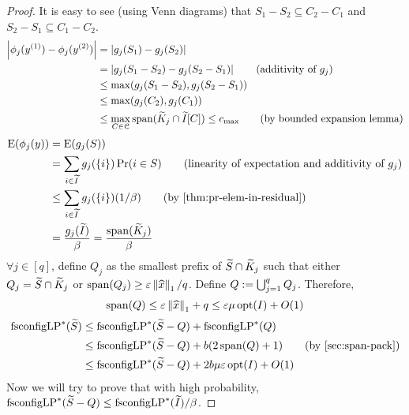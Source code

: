 \begin{proof}
It is easy to see (using Venn diagrams) that
$S_1 - S_2 \subseteq C_2 - C_1$ and $S_2 - S_1 \subseteq C_1 - C_2$.
\begin{align*}
\left\lvert \phi_j(y^{(1)}) - \phi_j(y^{(2)}) \right\rvert
&= \left\lvert g_j(S_1) - g_j(S_2) \right\rvert
\\ &= \left\lvert g_j(S_1 - S_2) - g_j(S_2 - S_1) \right\rvert  \tag{additivity of $g_j$}
\\ &\le \max(g_j(S_1 - S_2), g_j(S_2 - S_1))
\\ &\le \max(g_j(C_2), g_j(C_1))
\\ &\le \max_{C \in \mathcal{C}} \operatorname{span}(\widetilde{K}_j \cap \widetilde{I}[C])
\le c_{\max}  \tag{by bounded expansion lemma}
\end{align*}
\begin{align*}
\E(\phi_j(y)) &= \E(g_j(S))
\\ &= \sum_{i \in \Itild} g_j(\{i\}) \Pr(i \in S)
    \tag{linearity of expectation and additivity of $g_j$}
\\ &\le \sum_{i \in \Itild} g_j(\{i\}) (1/\beta)
    \tag{by \cref{thm:pr-elem-in-residual}}
\\ &= \frac{g_j(\Itild)}{\beta} = \frac{\Span(\Ktild_j)}{\beta}
\end{align*}
$\forall j \in [q]$, define $Q_j$ as the smallest prefix of $\widetilde{S} \cap \widetilde{K}_j$
such that either $Q_j = \widetilde{S} \cap \widetilde{K}_j$ or $\operatorname{span}(Q_j) \ge \varepsilon\left\lVert \widehat{x} \right\rVert_1/q$.
Define $Q := \bigcup_{j=1}^q Q_j$. Therefore,
\[ \operatorname{span}(Q) \le \varepsilon \left\lVert \widehat{x} \right\rVert_1 + q \le \varepsilon \mu \operatorname{opt}(I) + O(1) \]
\begin{align*}
\fscLP^*(\Stild) &\le \fscLP^*(\Stild - Q) + \fscLP^*(Q)
\\ &\le \fscLP^*(\Stild - Q) + b(2\Span(Q) + 1)  \tag{by \cref{sec:span-pack}}
\\ &\le \fscLP^*(\Stild - Q) + 2b\mu\epsLP\opt(I) + O(1)
\end{align*}
Now we will try to prove that with high probability,
$\operatorname{fsconfigLP}^*(\widetilde{S} - Q) \le \operatorname{fsconfigLP}^*(\widetilde{I})/\beta$.


\end{proof}
